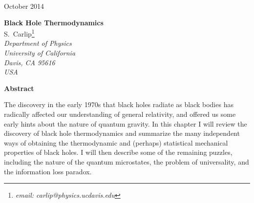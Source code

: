 \documentclass[12pt]{article}
\begin{document}
\begin{titlepage}
\vspace{.5in}
\begin{flushright}
October 2014\\  %
\end{flushright}
\vspace{.5in}
\begin{center}
{\Large\bf
 Black Hole Thermodynamics}\\  %
\vspace{.4in}
{S.~C{\sc arlip}\footnote{\it email: carlip@physics.ucdavis.edu}\\
       {\small\it Department of Physics}\\
       {\small\it University of California}\\
       {\small\it Davis, CA 95616}\\{\small\it USA}}
\end{center}

\vspace{.5in}
\begin{center}
{\large\bf Abstract}
\end{center}
\begin{center}
\begin{minipage}{4.75in}
{\small
The discovery in the early 1970s that black holes radiate as black bodies has 
radically affected our understanding of general relativity, and offered us some 
early hints about the nature of quantum gravity.  In this chapter I will review 
the discovery of black hole thermodynamics and summarize the many independent 
ways of obtaining the thermodynamic and (perhaps) statistical mechanical properties 
of black holes.  I will then describe some of the remaining puzzles, including the 
nature of the quantum microstates, the problem of universality, and the information 
loss paradox.
}
\end{minipage}
\end{center}
\end{titlepage}
\addtocounter{footnote}{-1}
 
\end{document}
